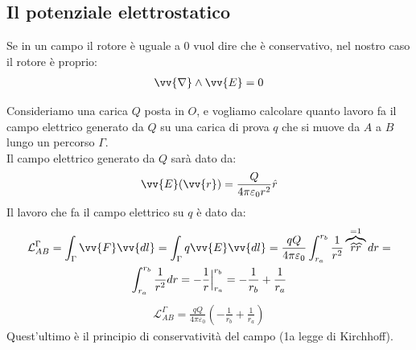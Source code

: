\documentclass[a4paper, oneside]{article}
\begin{document}
\subsection{Il potenziale elettrostatico}
Se in un campo il rotore è uguale a 0 vuol dire che è conservativo, nel nostro caso il rotore è proprio:
\begin{gather*}
    \vv{\nabla} \land \vv{E} = 0
\end{gather*}
\begin{figure}
    \begin{center}
\end{center}
\end{figure}
Consideriamo una carica $Q$ posta in $O$, e vogliamo calcolare quanto lavoro fa il campo elettrico generato da $Q$ su una carica di prova $q$ che si muove da $A$ a $B$ lungo un percorso $\Gamma$.\\
Il campo elettrico generato da $Q$ sarà dato da:
\begin{gather*}
    \vv{E}(\vv{r}) = \frac{Q}{4 \pi \varepsilon_0 r^2} \hat{r}
\end{gather*}
Il lavoro che fa il campo elettrico su $q$ è dato da:
\begin{gather*}
    \mathcal{L}_{AB}^\Gamma = \int_\Gamma \vv{F} \vv{dl} = \int_\Gamma q \vv{E} \vv{dl} = \frac{qQ}{4 \pi \varepsilon_0} \int_{r_a}^{r_b}  \frac{1}{r^2} \overbrace{\widehat{r} \widehat{r}}^{=1} dr =\\
    \int_{r_a}^{r_b} \frac{1}{r^2} dr = -\frac{1}{r}\Big|_{r_a}^{r_b} = -\frac{1}{r_b} + \frac{1}{r_a}
\end{gather*}
\begin{gather*}
    \mathcal{L}_{AB}^\Gamma = \frac{qQ}{4 \pi \varepsilon_0} \left( -\frac{1}{r_b} + \frac{1}{r_a} \right)
\end{gather*}
Quest'ultimo è il principio di conservatività del campo (1a legge di Kirchhoff).\\
\end{document}
